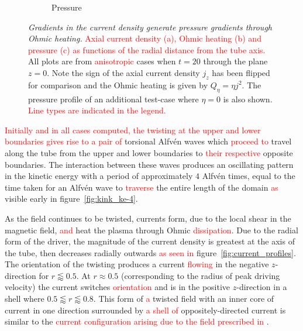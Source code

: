 \documentclass[12pt]{article}
\newcommand{\rs}[2]{\textcolor{red}{#2}}
\newcommand{\mycaption}[2]{\caption[#1]{\emph{#1} #2}}
\begin{document}
\begin{figure}[t]
\begin{subfigure}{0.32\textwidth}
      \caption{Pressure}
      \label{fig:pressure_profiles}
    \end{subfigure}
  \mycaption{Gradients in the current density generate pressure
    gradients through Ohmic heating.}{\rs{}{Axial current density (a), Ohmic heating
      (b) and pressure (c) as functions of the radial distance from
      the tube axis.}{} All plots are from \rs{switching}{anisotropic}
    cases when $t=20$ through the plane $z=0$. Note the sign of the
    axial current density $j_z$ has been flipped for comparison and
    the Ohmic heating is given by $Q_{\eta} = \eta j^2$. The pressure
    profile of an additional test-case where $\eta=0$ is also
    shown. \rs{}{Line types are indicated in the legend.}}%
  \label{fig:pressure_and_heating}
\end{figure}

\rs{In all cases, the initial reaction to the twisting at the upper
and lower boundaries is two}{Initially and in all cases computed, the
twisting at the upper and lower boundaries gives rise to a pair of}
torsional Alfv\'en waves which \rs{}{proceed to} travel along the tube
from the upper and lower boundaries to \rs{the}{their respective}
opposite boundaries. The interaction between these waves produces an 
oscillating pattern in the kinetic energy with a period of
approximately $4$ Alfv\'en times, equal to the time taken for an
Alfv\'en wave to \rs{travel}{traverse} the entire length of the domain
\rs{}{as} visible early in figure~\ref{fig:kink_ke-4}. 

As the field continues to be twisted, currents form, due to the local
shear in the magnetic field, \rs{which}{and} heat the plasma through Ohmic
\rs{heating}{dissipation}. Due to the radial form of the driver, the magnitude of the
current density is greatest at the axis of the tube, then decreases
radially outwards \rs{}{as seen in} figure~\ref{fig:current_profiles}. The orientation
of the twisting produces a current \rs{directed}{flowing} in the negative
$z$-direction for $r\lessapprox0.5$. At $r \approx 0.5$ (corresponding
to the radius of peak driving velocity) the current switches \rs{direction}{orientation}
and is in the positive $z$-direction in a shell where $0.5\lessapprox
r \lessapprox 0.8$. This form of \rs{}{a} twisted field with an inner core of
current in one direction surrounded by \rs{an}{a shell of}
oppositely-directed current is similar to the \rs{prescribed field in
chapter~}{current configuration arising due to the field prescribed in} \cite{quinnEffectAnisotropicViscosity2020a}. 
\end{document}
